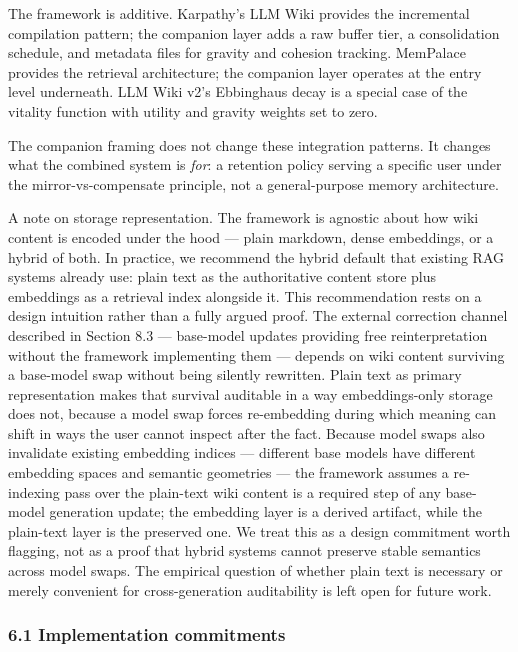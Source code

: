 \documentclass[
  11pt,
]{article}
\begin{document}
The framework is additive. Karpathy's LLM Wiki provides the incremental
compilation pattern; the companion layer adds a raw buffer tier, a
consolidation schedule, and metadata files for gravity and cohesion
tracking. MemPalace provides the retrieval architecture; the companion
layer operates at the entry level underneath. LLM Wiki v2's Ebbinghaus
decay is a special case of the vitality function with utility and
gravity weights set to zero.

The companion framing does not change these integration patterns. It
changes what the combined system is \emph{for}: a retention policy
serving a specific user under the mirror-vs-compensate principle, not a
general-purpose memory architecture.

A note on storage representation. The framework is agnostic about how
wiki content is encoded under the hood --- plain markdown, dense
embeddings, or a hybrid of both. In practice, we recommend the hybrid
default that existing RAG systems already use: plain text as the
authoritative content store plus embeddings as a retrieval index
alongside it. This recommendation rests on a design intuition rather
than a fully argued proof. The external correction channel described in
Section 8.3 --- base-model updates providing free reinterpretation
without the framework implementing them --- depends on wiki content
surviving a base-model swap without being silently rewritten. Plain text
as primary representation makes that survival auditable in a way
embeddings-only storage does not, because a model swap forces
re-embedding during which meaning can shift in ways the user cannot
inspect after the fact. Because model swaps also invalidate existing
embedding indices --- different base models have different embedding
spaces and semantic geometries --- the framework assumes a re-indexing
pass over the plain-text wiki content is a required step of any
base-model generation update; the embedding layer is a derived artifact,
while the plain-text layer is the preserved one. We treat this as a
design commitment worth flagging, not as a proof that hybrid systems
cannot preserve stable semantics across model swaps. The empirical
question of whether plain text is necessary or merely convenient for
cross-generation auditability is left open for future work.

\hypertarget{implementation-commitments}{%
\subsubsection{6.1 Implementation
commitments}\label{implementation-commitments}}
\end{document}
